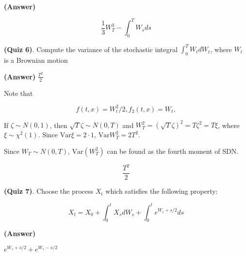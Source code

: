 \documentclass[12pt]{article}
\theoremstyle{nonumberbreak}
\begin{document}
\textbf{(Answer)} 

$$
\frac{1}{3} W_T^3 - \int_0^T W_s ds
$$


\textbf{(Quiz 6)}. Compute the variance of the stochastic integral $\int_0^TW_t dW_t$, where $W_t$ is a Brownian motion

\textbf{(Answer)} $\frac{T^2}{2}$

Note that 

$$
f(t,x) = W_t^2/2, f_2(t,x) = W_t, 
$$


If $\zeta \sim N(0,1)$, then $\sqrt{T} \zeta \sim N(0,T)$ and $W_T^2 = \left( \sqrt{T} \zeta \right)^2 = T \zeta^2 = T\xi$, where $\xi \sim \chi^2(1)$. Since $\mathrm{Var} \xi = 2\cdot 1$, $\mathrm{Var} W_T^2 = 2 T^2$. 

Since $W_T \sim N(0,T)$, $\mathrm{Var} (W_T^2)$ can be found as the fourth moment of SDN. 

$$
\frac{T^2}{2}
$$


\textbf{(Quiz 7)}. Choose the process $X_t$ which satisfies the following property:

$$
X_t = X_0 + \int_0^t X_s d W_s + \int_0^t e^{W_s + s/2} ds
$$

\textbf{(Answer)} 

$e^{W_s + s/2} + e^{W_s - s/2}$
\end{document}
